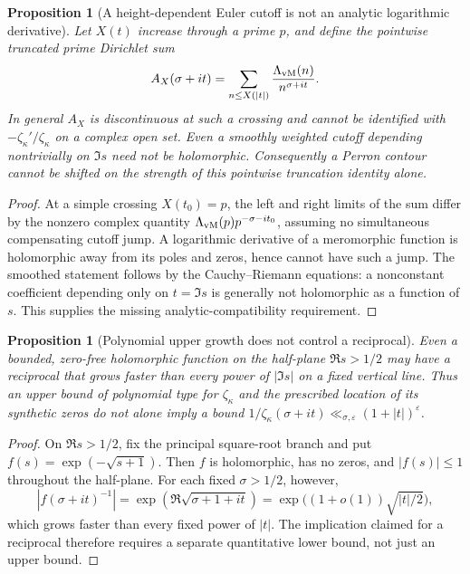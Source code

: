 \documentclass[11pt,reqno]{amsart}
\numberwithin{equation}{section}
\newtheorem{proposition}[theorem]{Proposition}
\begin{document}
\begin{proposition}[A height-dependent Euler cutoff is not an
analytic logarithmic derivative]\label{prop:notanalytic}
Let $X(t)$ increase through a prime $p$, and define the pointwise
truncated prime Dirichlet sum
\[
A_X(\sigma+it)=\sum_{n\le X(|t|)}\frac{\Lambda_{\rm vM}(n)}{n^{\sigma+it}}.
\]
In general $A_X$ is discontinuous at such a crossing and cannot
be identified with $-\zeta_\kappa'/\zeta_\kappa$ on a complex
open set. Even a smoothly weighted cutoff depending nontrivially
on $\Im s$ need not be holomorphic. Consequently a Perron
contour cannot be shifted on the strength of this pointwise
truncation identity alone.
\end{proposition}
\begin{proof}
At a simple crossing $X(t_0)=p$, the left and right limits of
the sum differ by the nonzero complex quantity
$\Lambda_{\rm vM}(p)p^{-\sigma-it_0}$, assuming no simultaneous
compensating cutoff jump. A logarithmic derivative of a
meromorphic function is holomorphic away from its poles and
zeros, hence cannot have such a jump. The smoothed statement
follows by the Cauchy--Riemann equations: a nonconstant
coefficient depending only on $t=\Im s$ is generally not
holomorphic as a function of $s$. This supplies the missing
analytic-compatibility requirement.
\end{proof}

\begin{proposition}[Polynomial upper growth does not control a reciprocal]
\label{prop:reciprocalgap}
Even a bounded, zero-free holomorphic function on the half-plane
$\Re s>1/2$ may have a reciprocal that grows faster than every
power of $|\Im s|$ on a fixed vertical line. Thus an upper bound
of polynomial type for $\zeta_\kappa$ and the prescribed location
of its synthetic zeros do not alone imply a bound
$1/\zeta_\kappa(\sigma+it)\ll_{\sigma,\varepsilon}(1+|t|)^\varepsilon$.
\end{proposition}
\begin{proof}
On $\Re s>1/2$, fix the principal square-root branch and put
$f(s)=\exp(-\sqrt{s+1})$. Then $f$ is holomorphic, has no zeros,
and $|f(s)|\le1$ throughout the half-plane. For each fixed
$\sigma>1/2$, however,
\[
|f(\sigma+it)^{-1}|=
\exp(\Re\sqrt{\sigma+1+it})
=\exp\bigl((1+o(1))\sqrt{|t|/2}\bigr),
\]
which grows faster than every fixed power of $|t|$.
The implication claimed for a reciprocal therefore requires a
separate quantitative lower bound, not just an upper bound.
\end{proof}
\end{document}
